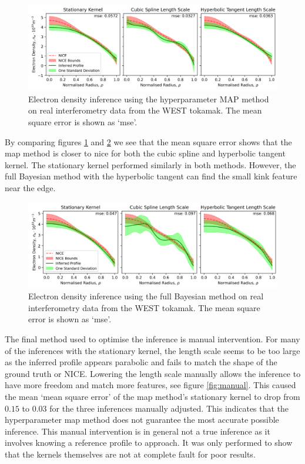 \begin{figure}[H]
    \centering
    \includegraphics[width=\textwidth]{images/Final/map_real.png}
    \caption{Electron density inference using the hyperparameter MAP method on real interferometry data from the WEST tokamak. The mean square error is shown as `mse'.}
    \label{fig:map_real}
\end{figure}

By comparing figures \ref{fig:map_real} and \ref{fig:fb_real} we see that the mean square error shows that the \gls{map} method is closer to \gls{nice} for both the cubic spline and hyperbolic tangent kernel. The stationary kernel performed similarly in both methods. However, the full Bayesian method with the hyperbolic tangent can find the small kink feature near the edge.

\begin{figure}[H]
    \centering
    \includegraphics[width=\textwidth]{images/Final/FB_real.png}
    \caption{Electron density inference using the full Bayesian method on real interferometry data from the WEST tokamak. The mean square error is shown as `mse'.}
    \label{fig:fb_real}
\end{figure}

The final method used to optimise the inference is manual intervention. For many of the inferences with the stationary kernel, the length scale seems to be too large as the inferred profile appears parabolic and fails to match the shape of the ground truth or NICE. Lowering the length scale manually allows the inference to have more freedom and match more features, see figure \ref{fig:manual}. This caused the mean `mean square error' of the \gls{map} method's stationary kernel to drop from $0.15$ to $0.03$ for the three inferences manually adjusted. This indicates that the hyperparameter \gls{map} method does not guarantee the most accurate possible inference. This manual intervention is in general not a true inference as it involves knowing a reference profile to approach. It was only performed to show that the kernels themselves are not at complete fault for poor results.

